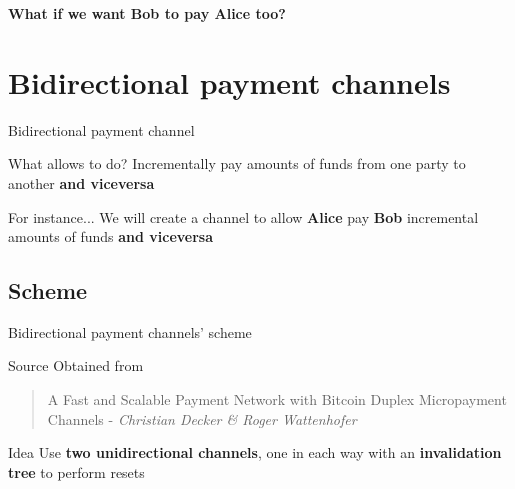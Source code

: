 \documentclass{beamer}
\begin{document}
\begin{frame}
 \begin{center}
  \textbf{What if we want Bob to pay Alice too?}
 \end{center}
\end{frame}
\section{Bidirectional payment channels}
\begin{frame}{Bidirectional payment channel}
 \begin{block}{What allows to do?}
  Incrementally pay amounts of funds from one party to another \textbf{and viceversa}
 \end{block}
 \begin{exampleblock}{For instance...}
  We will create a channel to allow \textbf{Alice} pay \textbf{Bob} incremental amounts of funds \textbf{and viceversa}
 \end{exampleblock}
\end{frame}
\subsection{Scheme}
\begin{frame}{Bidirectional payment channels' scheme}
 \begin{block}{Source}
  Obtained from
  \begin{quote}
   A Fast and Scalable Payment Network with Bitcoin Duplex Micropayment Channels - \textit{Christian Decker \& Roger Wattenhofer}
  \end{quote}
 \end{block}
 \begin{block}{Idea}
  Use \textbf{two unidirectional channels}, one in each way with an \textbf{invalidation tree} to perform resets
 \end{block}
\end{frame}
\end{document}
